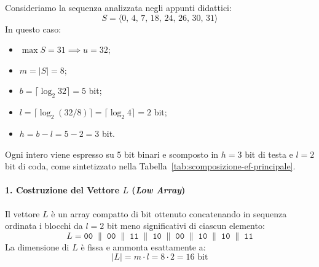 Consideriamo la sequenza analizzata negli appunti didattici:
\begin{equation}
  S = \langle 0, \, 4, \, 7, \, 18, \, 24, \, 26, \, 30, \, 31 \rangle
\end{equation}
In questo caso:
\begin{itemize}
  \item $\max S = 31 \implies u = 32$;
  \item $m = |S| = 8$;
  \item $b = \lceil \log_2 32 \rceil = 5$ bit;
  \item $l = \lceil \log_2(32 / 8) \rceil = \lceil \log_2 4 \rceil = 2$ bit;
  \item $h = b - l = 5 - 2 = 3$ bit.
\end{itemize}

Ogni intero viene espresso su 5 bit binari e scomposto in $h = 3$ bit di testa e $l = 2$ bit di coda, come sintetizzato nella Tabella~\ref{tab:scomposizione-ef-principale}.

\begin{table}[H]
\centering
\small
\caption{Scomposizione binaria degli elementi di $S$ per la codifica di Elias-Fano.}
\label{tab:scomposizione-ef-principale}
\end{table}

\paragraph{1. Costruzione del Vettore $L$ (\textit{Low Array})}
Il vettore $L$ \`e un array compatto di bit ottenuto concatenando in sequenza ordinata i blocchi da $l = 2$ bit meno significativi di ciascun elemento:
\begin{equation}
  L = \texttt{00} \;\|\; \texttt{00} \;\|\; \texttt{11} \;\|\; \texttt{10} \;\|\; \texttt{00} \;\|\; \texttt{10} \;\|\; \texttt{10} \;\|\; \texttt{11}
\end{equation}
La dimensione di $L$ \`e fissa e ammonta esattamente a:
\begin{equation}
  |L| = m \cdot l = 8 \cdot 2 = 16 \text{ bit}
\end{equation}

